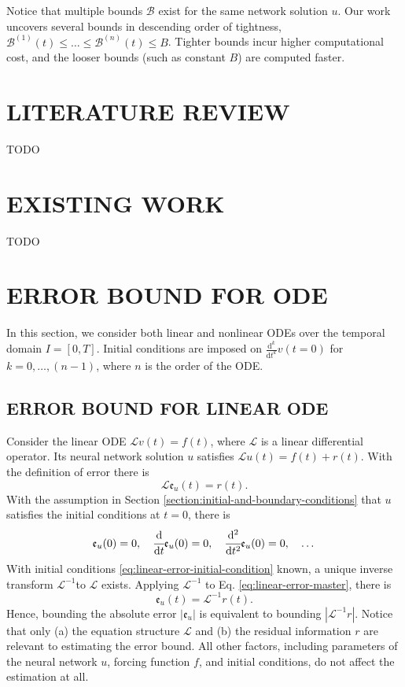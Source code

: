 \documentclass[accepted]{uai2023}
\newcommand{\dt}[1]{\cfrac{\mathrm{d} #1}{\mathrm{d} t}}
\newcommand{\dnt}[2]{\cfrac{\mathrm{d}^{#1} #2}{\mathrm{d} t^{#1}}}
\newcommand{\Err}{\mathfrak{e}}
\newcommand{\Bound}{\mathcal{B}}
\renewcommand{\L}{\mathcal{L}}
\begin{document}
    Notice that multiple bounds $\Bound$ exist for the same network solution $u$.
    Our work uncovers several bounds in descending order of tightness, $\Bound^{(1)}(t) \leq \dots \leq \Bound^{(n)}(t) \leq B$. Tighter bounds incur higher computational cost, and the looser bounds (such as constant $B$) are computed faster.


\section{LITERATURE REVIEW}
    TODO

\section{EXISTING WORK}
    TODO
\section{ERROR BOUND FOR ODE}
    In this section, we consider both linear and nonlinear ODEs over the temporal domain $I=[0, T]$. 
    Initial conditions are imposed on $\frac{\mathrm{d}^k}{\mathrm{d}t^k}v(t=0)$ for $k = 0, \dots, (n - 1)$, where $n$ is the order of the ODE.

\subsection{ERROR BOUND FOR LINEAR ODE}\label{section:error-bound-for-linear-odes}
    Consider the linear ODE $\L v(t) = f(t)$, where $\L$ is a linear differential operator. 
    Its neural network solution $u$ satisfies $\L u(t) = f(t) + r(t)$. 
    With the definition of error there is
    {   
        \small
        \begin{equation} \label{eq:linear-error-master}
            \L \Err_u(t) = r(t).
        \end{equation}
    }
    With the assumption in Section \ref{section:initial-and-boundary-conditions} that $u$ satisfies the initial conditions at $t=0$, there is
    {
        \small
        \begin{equation} \label{eq:linear-error-initial-condition}
            \Err_u(0) = 0, \quad \dt{}{}\Err_u(0) = 0, \quad \dnt{2}{}\Err_u(0) = 0, \quad \dots 
        \end{equation}
    }
    With initial conditions \ref{eq:linear-error-initial-condition} known, a unique inverse transform $\L^{-1}$to $\L$ exists. 
    Applying $\L^{-1}$ to Eq. \ref{eq:linear-error-master}, there is 
    {
        \small
        \begin{equation}\label{eq:linear-error-inverse-master}
            \Err_u(t) = \L^{-1} r(t).
        \end{equation}
    }
    Hence, bounding the absolute error $\left|\Err_u\right|$ is equivalent to bounding $\left|\L^{-1} r\right|$. 
    Notice that only (a) the equation structure $\L$ and (b) the residual information $r$ are relevant to estimating the error bound. 
    All other factors, including parameters of the neural network $u$, forcing function $f$, and initial conditions, do not affect the estimation at all.
\end{document}
